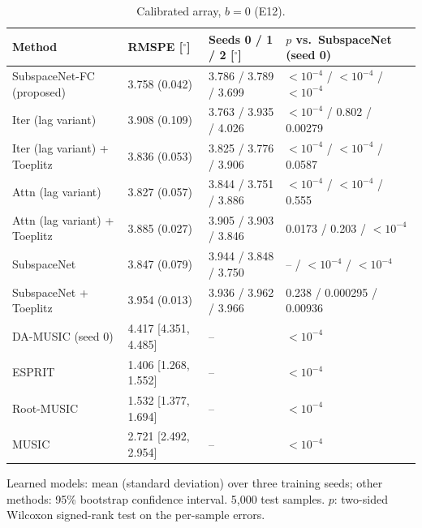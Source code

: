 \begin{table}[h!]
\centering
\small
\caption{Calibrated array, $b=0$ (E12).}
\label{tab:e12}
\begin{tabular}{llll}
\toprule
Method & RMSPE [$^\circ$] & Seeds 0 / 1 / 2 [$^\circ$] & $p$ vs.\ SubspaceNet (seed 0) \\
\midrule
SubspaceNet-FC (proposed) & 3.758 (0.042) & 3.786 / 3.789 / 3.699 & $<10^{-4}$ / $<10^{-4}$ / $<10^{-4}$ \\
Iter (lag variant) & 3.908 (0.109) & 3.763 / 3.935 / 4.026 & $<10^{-4}$ / 0.802 / 0.00279 \\
Iter (lag variant) + Toeplitz & 3.836 (0.053) & 3.825 / 3.776 / 3.906 & $<10^{-4}$ / $<10^{-4}$ / 0.0587 \\
Attn (lag variant) & 3.827 (0.057) & 3.844 / 3.751 / 3.886 & $<10^{-4}$ / $<10^{-4}$ / 0.555 \\
Attn (lag variant) + Toeplitz & 3.885 (0.027) & 3.905 / 3.903 / 3.846 & 0.0173 / 0.203 / $<10^{-4}$ \\
SubspaceNet & 3.847 (0.079) & 3.944 / 3.848 / 3.750 & -- / $<10^{-4}$ / $<10^{-4}$ \\
SubspaceNet + Toeplitz & 3.954 (0.013) & 3.936 / 3.962 / 3.966 & 0.238 / 0.000295 / 0.00936 \\
\midrule
DA-MUSIC (seed 0) & 4.417 [4.351, 4.485] & -- & $<10^{-4}$ \\
ESPRIT & 1.406 [1.268, 1.552] & -- & $<10^{-4}$ \\
Root-MUSIC & 1.532 [1.377, 1.694] & -- & $<10^{-4}$ \\
MUSIC & 2.721 [2.492, 2.954] & -- & $<10^{-4}$ \\
\hline
\end{tabular}
\par\smallskip\parbox{0.95\textwidth}{\footnotesize Learned models: mean (standard deviation) over three training seeds; other methods: 95\% bootstrap confidence interval. 5,000 test samples. $p$: two-sided Wilcoxon signed-rank test on the per-sample errors.}
\end{table}
